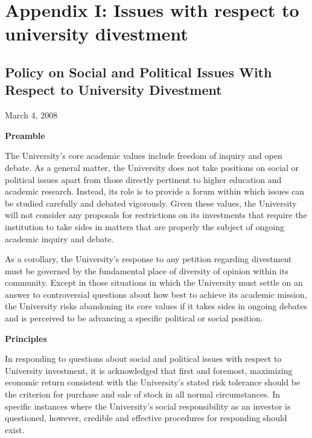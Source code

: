 \documentclass[10pt]{article}
\begin{document}
\clearpage



		\singlespacing
		\section{Appendix I: Issues with respect to university divestment}
		\label{sec:DivestmentPolicy}
		\doublespacing
		
		
		
	\subsection{Policy on Social and Political Issues With Respect to University Divestment}
	\label{PolicySocialPolitical}

	
	
March 4, 2008



\textbf{Preamble}

 

The University's core academic values include freedom of inquiry and open debate. As a general matter, the University does not take positions on social or political issues apart from those directly pertinent to higher education and academic research.  Instead, its role is to provide a forum within which issues can be studied carefully and debated vigorously. Given these values, the University will not consider any proposals for restrictions on its investments that require the institution to take sides in matters that are properly the subject of ongoing academic inquiry and debate.

 

As a corollary, the University's response to any petition regarding divestment must be governed by the fundamental place of diversity of opinion within its community. Except in those situations in which the University must settle on an answer to controversial questions about how best to achieve its academic mission, the University risks abandoning its core values if it takes sides in ongoing debates and is perceived to be advancing a specific political or social position.



\textbf{Principles}

 

In responding to questions about social and political issues with respect to University investment, it is acknowledged that first and foremost, maximizing economic return consistent with the University’s stated risk tolerance should be the criterion for purchase and sale of stock in all normal circumstances. In specific instances where the University's social responsibility as an investor is questioned, however, credible and effective procedures for responding should exist.
\end{document}
